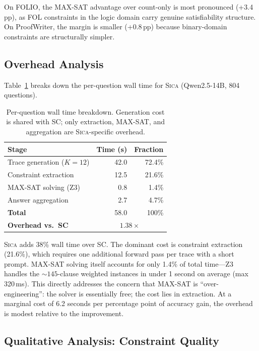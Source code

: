 \documentclass[11pt,a4paper]{article}
\newcommand{\sica}{\textsc{Sica}}
\begin{document}
On FOLIO, the MAX-SAT advantage over count-only is most pronounced (+3.4\,pp), as FOL constraints in the logic domain carry genuine satisfiability structure.
On ProofWriter, the margin is smaller (+0.8\,pp) because binary-domain constraints are structurally simpler.


\subsection{Overhead Analysis}
\label{sec:overhead}

Table~\ref{tab:overhead} breaks down the per-question wall time for \sica{} (Qwen2.5-14B, 804 questions).

\begin{table}[t]
\centering
\caption{Per-question wall time breakdown. Generation cost is shared with SC; only extraction, MAX-SAT, and aggregation are \sica{}-specific overhead.}
\label{tab:overhead}
\small
\begin{tabular}{@{}l rr@{}}
\toprule
\textbf{Stage} & \textbf{Time (s)} & \textbf{Fraction} \\
\midrule
Trace generation ($K{=}12$) & 42.0 & 72.4\% \\
Constraint extraction        & 12.5 & 21.6\% \\
MAX-SAT solving (Z3)         &  0.8 &  1.4\% \\
Answer aggregation           &  2.7 &  4.7\% \\
\midrule
\textbf{Total}               & 58.0 & 100\% \\
\midrule
\textbf{Overhead vs.\ SC}    & \multicolumn{2}{c}{$\mathbf{1.38\times}$} \\
\bottomrule
\end{tabular}
\end{table}

\sica{} adds 38\% wall time over SC.
The dominant cost is constraint extraction (21.6\%), which requires one additional forward pass per trace with a short prompt.
MAX-SAT solving itself accounts for only 1.4\% of total time---Z3 handles the ${\sim}145$-clause weighted instances in under 1 second on average (max 320\,ms).
This directly addresses the concern that MAX-SAT is ``over-engineering'': the solver is essentially free; the cost lies in extraction.
At a marginal cost of 6.2 seconds per percentage point of accuracy gain, the overhead is modest relative to the improvement.


\subsection{Qualitative Analysis: Constraint Quality}
\label{sec:casestudies}
\end{document}
